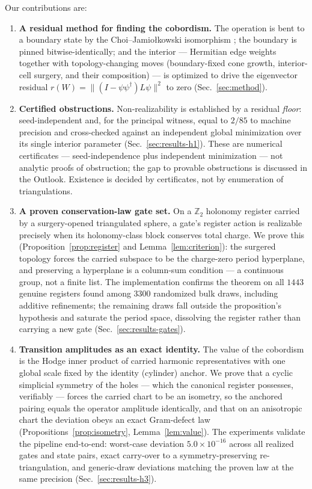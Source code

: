 \documentclass[a4paper,twocolumn,11pt,unpublished]{quantumarticle}
\theoremstyle{plain}
\theoremstyle{remark}
\begin{document}
Our contributions are:
\begin{enumerate}
\item \textbf{A residual method for finding the cobordism.} The operation
  is bent to a boundary state by the Choi--Jamio{\l}kowski isomorphism
  \cite{Choi1975CompletelyPositive,Jamiolkowski1972LinearTransformations,AbramskyCoecke2004Categorical};
  the boundary is pinned bitwise-identically; and the interior ---
  Hermitian edge weights together with topology-changing moves
  (boundary-fixed cone growth, interior-cell surgery, and their
  composition) --- is optimized to drive the eigenvector residual
  $r(W)=\lVert(I-\psi\psi^\dagger)L\psi\rVert^2$ to zero
  (Sec.~\ref{sec:method}).
\item \textbf{Certified obstructions.} Non-realizability is established by
  a residual \emph{floor}: seed-independent and, for the principal witness,
  equal to $2/85$ to machine precision and cross-checked against an
  independent global minimization over its single interior parameter
  (Sec.~\ref{sec:results-h1}). These are numerical certificates ---
  seed-independence plus independent minimization --- not analytic proofs
  of obstruction; the gap to provable obstructions is discussed in the
  Outlook. Existence is decided by certificates, not by enumeration of
  triangulations.
\item \textbf{A proven conservation-law gate set.} On a $\mathbb{Z}_2$
  holonomy register carried by a surgery-opened triangulated sphere, a
  gate's register action is realizable precisely when its holonomy-class
  block conserves total charge. We prove this
  (Proposition~\ref{prop:register} and Lemma~\ref{lem:criterion}): the
  surgered topology forces the carried subspace to be the charge-zero
  period hyperplane, and preserving a hyperplane is a column-sum
  condition --- a continuous group, not a finite list. The implementation
  confirms the theorem on all $1443$ genuine registers found among
  $3300$ randomized bulk draws, including additive refinements; the
  remaining draws fall outside the proposition's hypothesis and saturate
  the period space, dissolving the register rather than carrying a new
  gate (Sec.~\ref{sec:results-gates}).
\item \textbf{Transition amplitudes as an exact identity.} The value of
  the cobordism is the Hodge inner product of carried harmonic
  representatives with one global scale fixed by the identity (cylinder)
  anchor. We prove that a cyclic simplicial symmetry of the holes ---
  which the canonical register possesses, verifiably --- forces the
  carried chart to be an isometry, so the anchored pairing equals the
  operator amplitude identically, and that on an anisotropic chart the
  deviation obeys an exact Gram-defect law
  (Propositions~\ref{prop:isometry}, Lemma~\ref{lem:value}). The
  experiments validate the pipeline end-to-end: worst-case deviation
  $5.0\times10^{-16}$ across all realized gates and state pairs, exact
  carry-over to a symmetry-preserving re-triangulation, and generic-draw
  deviations matching the proven law at the same precision
  (Sec.~\ref{sec:results-h3}).
\end{enumerate}
\end{document}
